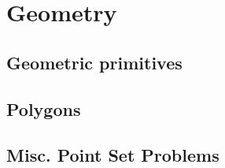 \chapter{Geometry}  
\section{Geometric primitives}
\section{Polygons}
\section{Misc. Point Set Problems}
